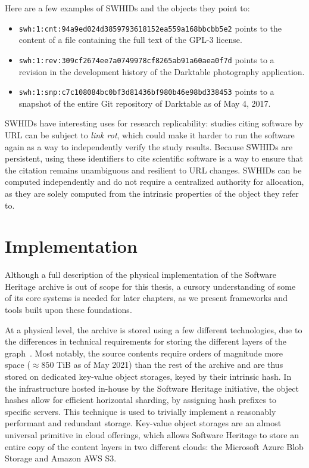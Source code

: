 Here are a few examples of \glspl{SWHID} and the objects they point to:

\begin{itemize}
    \setlength\itemsep{0em}
    \item \texttt{swh:1:cnt:94a9ed024d3859793618152ea559a168bbcbb5e2} points to
        the content of a file containing the full text of the GPL-3 license.
    \item \texttt{swh:1:rev:309cf2674ee7a0749978cf8265ab91a60aea0f7d} points to
        a revision in the development history of the Darktable photography
        application.
    \item \texttt{swh:1:snp:c7c108084bc0bf3d81436bf980b46e98bd338453} points to
        a snapshot of the entire Git repository of Darktable as of May 4, 2017.
\end{itemize}

\glspl{SWHID} have interesting uses for research replicability: studies
citing software by URL can be subject to \emph{link rot}, which could make it
harder to run the software again as a way to independently verify the study
results. Because \glspl{SWHID} are persistent, using these identifiers to cite
scientific software is a way to ensure that the citation remains unambiguous
and resilient to URL changes. \glspl{SWHID} can be computed independently and
do not require a centralized authority for allocation, as they are solely
computed from the intrinsic properties of the object they refer to.

\section{Implementation}%
\label{sec:swh-infrastructure}

Although a full description of the physical implementation of the Software
Heritage archive is out of scope for this thesis, a cursory understanding of
some of its core systems is needed for later chapters, as we present frameworks
and tools built upon these foundations.

At a physical level, the archive is stored using a few different technologies,
due to the differences in technical requirements for storing the different
layers of the graph~\cite{swhipres2017}.
Most notably, the source contents require orders of magnitude more space
($\approx 850$ TiB as of May 2021) than the rest of the archive and are thus
stored on dedicated key-value object storages, keyed by their intrinsic hash.
In the infrastructure hosted in-house by the Software Heritage initiative, the
object hashes allow for efficient horizontal sharding, by assigning hash
prefixes to specific servers. This technique is used to trivially implement a
reasonably performant and redundant storage.
Key-value object storages are an almost universal primitive in cloud offerings,
which allows Software Heritage to store an entire copy of the content layers in
two different clouds: the Microsoft Azure Blob Storage and Amazon AWS S3.

